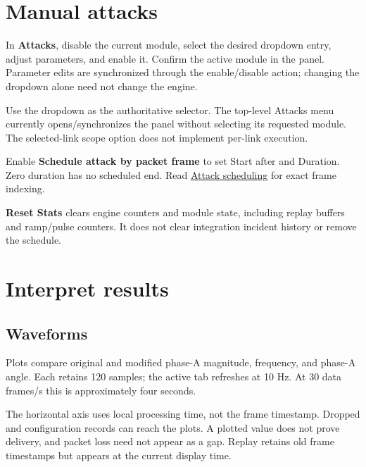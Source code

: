 \section*{Manual attacks}
In \textbf{Attacks}, disable the current module, select the desired dropdown entry, adjust parameters, and enable it. Confirm the active module in the panel. Parameter edits are synchronized through the enable/disable action; changing the dropdown alone need not change the engine.

Use the dropdown as the authoritative selector. The top-level Attacks menu currently opens/synchronizes the panel without selecting its requested module. The selected-link scope option does not implement per-link execution.

Enable \textbf{Schedule attack by packet frame} to set Start after and Duration. Zero duration has no scheduled end. Read \hyperref[chapter-6]{Attack scheduling} for exact frame indexing.

\textbf{Reset Stats} clears engine counters and module state, including replay buffers and ramp/pulse counters. It does not clear integration incident history or remove the schedule.

\section*{Interpret results}
\subsection*{Waveforms}
Plots compare original and modified phase-A magnitude, frequency, and phase-A angle. Each retains 120 samples; the active tab refreshes at 10 Hz. At 30 data frames/s this is approximately four seconds.

The horizontal axis uses local processing time, not the frame timestamp. Dropped and configuration records can reach the plots. A plotted value does not prove delivery, and packet loss need not appear as a gap. Replay retains old frame timestamps but appears at the current display time.

